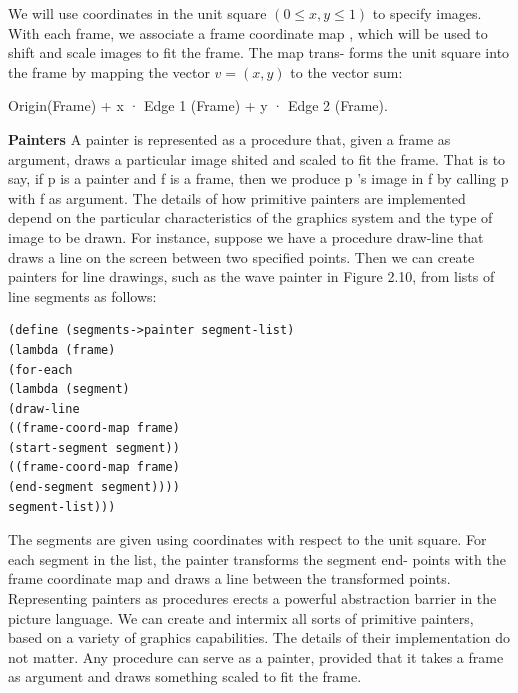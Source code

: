 \documentclass[a4paper,twoside]{article}
\numberwithin{equation}{section}
\begin{document}
We will use coordinates in the unit square $(0 \leq x, y \leq 1)$ to specify images. With each frame,
we associate a frame coordinate map , which
will be used to shift and scale images to fit the frame. The map trans-
forms the unit square into the frame by mapping the vector $v = (x , y)$
to the vector sum:
\begin{center}
    Origin(Frame) + x · Edge 1 (Frame) + y · Edge 2 (Frame).
\end{center}
\textbf{Painters}\newline
A painter is represented as a procedure that, given a frame as argument,
draws a particular image shited and scaled to fit the frame. That is to
say, if p is a painter and f is a frame, then we produce p 's image in f by
calling p with f as argument. The details of how primitive painters are implemented depend on the
particular characteristics of the graphics system and the type of image to be drawn. For instance,
suppose we have a procedure draw-line that draws a line on the screen between two specified points.
Then we can create painters for line drawings, such as the wave painter in Figure 2.10, from lists
of line segments as follows:
\begin{lstlisting}
(define (segments->painter segment-list)
(lambda (frame)
(for-each
(lambda (segment)
(draw-line
((frame-coord-map frame)
(start-segment segment))
((frame-coord-map frame)
(end-segment segment))))
segment-list)))
\end{lstlisting}
The segments are given using coordinates with respect to the unit square.
For each segment in the list, the painter transforms the segment end-
points with the frame coordinate map and draws a line between the
transformed points. Representing painters as procedures erects a powerful abstraction
barrier in the picture language. We can create and intermix all sorts of
primitive painters, based on a variety of graphics capabilities. The details of their implementation
do not matter. Any procedure can serve as a painter, provided that it takes a frame as argument and
draws something scaled to fit the frame.
\end{document}
